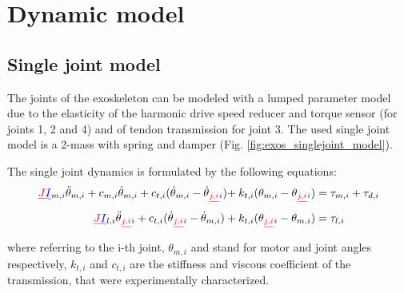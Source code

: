 \section{Dynamic model} \label{sec:dynamic_model}

\subsection{Single joint model} \label{Single joint model}
The joints of the exoskeleton can be modeled with a lumped parameter model due to the elasticity of the harmonic drive speed reducer and torque sensor (for joints 1, 2 and 4) and of tendon transmission for joint 3. The used single joint model is a 2-mass with spring and damper (Fig. \ref{fig:exos_singlejoint_model}).
\par The single joint dynamics is formulated by the following equations:
\setlength{\arraycolsep}{0.0em}
\footnotesize
\begin{align}
\DIFdelbegin \DIFdel{J}\DIFdelend \DIFaddbegin \DIFadd{I}\DIFaddend _{m,i} \ddot{\theta}_{m,i}  + c_{m,i}\dot{\theta}_{m,i} + c_{t,i} (\dot{\theta}_{m,i}-\dot{\theta}\DIFdelbegin \DIFdel{_{j,i}}\DIFdelend \DIFaddbegin \DIFadd{_{i}}\DIFaddend )  
{+}\:k_{t,i} ({\theta_{m,i}}-{\theta\DIFdelbegin \DIFdel{_{j,i}}\DIFdelend \DIFaddbegin \DIFadd{_i}\DIFaddend }) &= \tau_{m,i}+\tau_ {d,i} \nonumber	\\
\label{eqn:dinamicaLinkSingoloGiunto}
\DIFdelbegin \DIFdel{J}\DIFdelend \DIFaddbegin \DIFadd{I}\DIFaddend _{l,i} \ddot{\theta}\DIFdelbegin \DIFdel{_{j,i}}\DIFdelend \DIFaddbegin \DIFadd{_{i}}\DIFaddend +c_{t,i} (\dot{\theta}\DIFdelbegin \DIFdel{_{j,i}}\DIFdelend \DIFaddbegin \DIFadd{_{i}}\DIFaddend -\dot{\theta}_{m,i})
+k_{t,i} ({\theta\DIFdelbegin \DIFdel{_{j,i}}\DIFdelend \DIFaddbegin \DIFadd{_{i}}\DIFaddend }-{\theta_{m,i}}) &= \tau_{l,i}	
\end{align}
\normalsize
\setlength{\arraycolsep}{5pt}
where referring to the i-th joint, $\theta_ {m,i}$ and \DIFdelbegin {}\DIFdelend \DIFaddbegin {}\DIFaddend stand for motor and joint angles respectively, $k_{t,i}$ and $c_{t,i}$ are the stiffness and viscous coefficient of the transmission, that were experimentally characterized.
